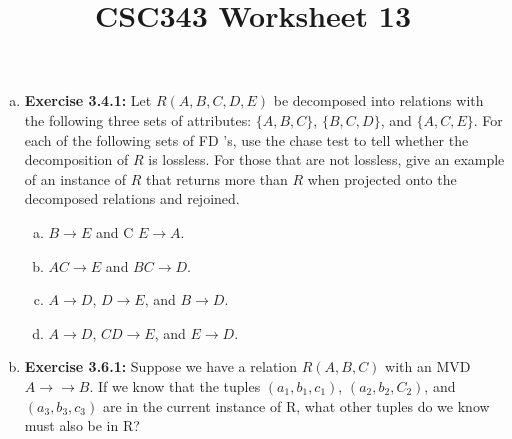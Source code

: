 \documentclass[12pt]{article}
\begin{document}
\title{CSC343 Worksheet 13}
\maketitle

\begin{enumerate}[a)]
    \item \textbf{Exercise 3.4.1:} Let $R(A, B, C, D, E)$ be decomposed into relations with the
    following three sets of attributes: $\{A, B, C\}$, $\{B, C, D\}$, and $\{A, C, E\}$. For each
    of the following sets of FD 's, use the chase test to tell whether the decomposition
    of $R$ is lossless. For those that are not lossless, give an example of an instance
    of $R$ that returns more than $R$ when projected onto the decomposed relations
    and rejoined.

    \begin{enumerate}[a)]
        \item $B \to E$ and C $E \to A$.
        \item $AC \to E$ and $BC \to D$.
        \item $A \to D$, $D \to E$, and $B \to D$.
        \item $A \to D$, $CD \to E$, and $E \to D$.
    \end{enumerate}

    \bigskip

    \item \textbf{Exercise 3.6.1:} Suppose we have a relation $R(A, B, C)$ with an
    MVD $A \to\to B$. If we know that the tuples $(a_1, b_1, c_1)$, $(a_2, b_2, C_2)$, and $(a_3, b_3, c_3)$
    are in the current instance of R, what other tuples do we know must also be in R?
\end{enumerate}
\end{document}
